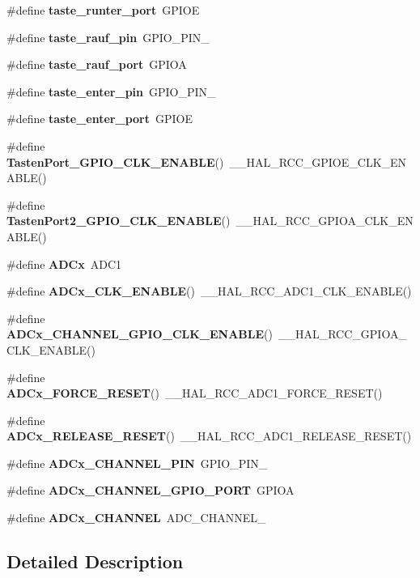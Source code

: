 \begin{DoxyCompactItemize}
\#define \textbf{ taste\+\_\+runter\+\_\+port}~G\+P\+I\+OE
\item 
\#define \textbf{ taste\+\_\+rauf\+\_\+pin}~G\+P\+I\+O\+\_\+\+P\+I\+N\+\_
\item 
\#define \textbf{ taste\+\_\+rauf\+\_\+port}~G\+P\+I\+OA
\item 
\#define \textbf{ taste\+\_\+enter\+\_\+pin}~G\+P\+I\+O\+\_\+\+P\+I\+N\+\_
\item 
\#define \textbf{ taste\+\_\+enter\+\_\+port}~G\+P\+I\+OE
\item 
\#define \textbf{ Tasten\+Port\+\_\+\+G\+P\+I\+O\+\_\+\+C\+L\+K\+\_\+\+E\+N\+A\+B\+LE}()~\+\_\+\+\_\+\+H\+A\+L\+\_\+\+R\+C\+C\+\_\+\+G\+P\+I\+O\+E\+\_\+\+C\+L\+K\+\_\+\+E\+N\+A\+B\+LE()
\item 
\#define \textbf{ Tasten\+Port2\+\_\+\+G\+P\+I\+O\+\_\+\+C\+L\+K\+\_\+\+E\+N\+A\+B\+LE}()~\+\_\+\+\_\+\+H\+A\+L\+\_\+\+R\+C\+C\+\_\+\+G\+P\+I\+O\+A\+\_\+\+C\+L\+K\+\_\+\+E\+N\+A\+B\+LE()
\item 
\#define \textbf{ A\+D\+Cx}~A\+D\+C1
\item 
\#define \textbf{ A\+D\+Cx\+\_\+\+C\+L\+K\+\_\+\+E\+N\+A\+B\+LE}()~\+\_\+\+\_\+\+H\+A\+L\+\_\+\+R\+C\+C\+\_\+\+A\+D\+C1\+\_\+\+C\+L\+K\+\_\+\+E\+N\+A\+B\+LE()
\item 
\#define \textbf{ A\+D\+Cx\+\_\+\+C\+H\+A\+N\+N\+E\+L\+\_\+\+G\+P\+I\+O\+\_\+\+C\+L\+K\+\_\+\+E\+N\+A\+B\+LE}()~\+\_\+\+\_\+\+H\+A\+L\+\_\+\+R\+C\+C\+\_\+\+G\+P\+I\+O\+A\+\_\+\+C\+L\+K\+\_\+\+E\+N\+A\+B\+LE()
\item 
\#define \textbf{ A\+D\+Cx\+\_\+\+F\+O\+R\+C\+E\+\_\+\+R\+E\+S\+ET}()~\+\_\+\+\_\+\+H\+A\+L\+\_\+\+R\+C\+C\+\_\+\+A\+D\+C1\+\_\+\+F\+O\+R\+C\+E\+\_\+\+R\+E\+S\+ET()
\item 
\#define \textbf{ A\+D\+Cx\+\_\+\+R\+E\+L\+E\+A\+S\+E\+\_\+\+R\+E\+S\+ET}()~\+\_\+\+\_\+\+H\+A\+L\+\_\+\+R\+C\+C\+\_\+\+A\+D\+C1\+\_\+\+R\+E\+L\+E\+A\+S\+E\+\_\+\+R\+E\+S\+ET()
\item 
\#define \textbf{ A\+D\+Cx\+\_\+\+C\+H\+A\+N\+N\+E\+L\+\_\+\+P\+IN}~G\+P\+I\+O\+\_\+\+P\+I\+N\+\_
\item 
\#define \textbf{ A\+D\+Cx\+\_\+\+C\+H\+A\+N\+N\+E\+L\+\_\+\+G\+P\+I\+O\+\_\+\+P\+O\+RT}~G\+P\+I\+OA
\item 
\#define \textbf{ A\+D\+Cx\+\_\+\+C\+H\+A\+N\+N\+EL}~A\+D\+C\+\_\+\+C\+H\+A\+N\+N\+E\+L\+\_
\end{DoxyCompactItemize}


\subsection{Detailed Description}


